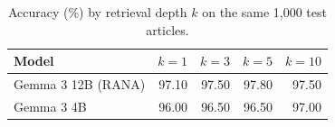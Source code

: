 \begin{table}[t]
\small
\centering
\caption{Accuracy (\%) by retrieval depth $k$ on the same 1,000 test articles.}\label{tbl_ksweep}
\begin{tabular*}{\tblwidth}{@{\extracolsep{\fill}}LRRRR@{}}
\toprule
\textbf{Model} & \textbf{$k=1$} & \textbf{$k=3$} & \textbf{$k=5$} & \textbf{$k=10$} \\
\midrule
Gemma 3 12B (RANA) & 97.10 & 97.50 & 97.80 & 97.50 \\
Gemma 3 4B & 96.00 & 96.50 & 96.50 & 97.00 \\
\bottomrule
\end{tabular*}
\end{table}
